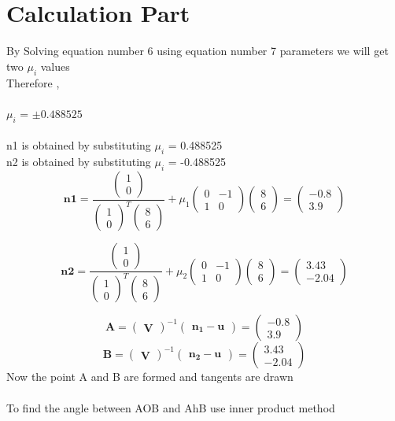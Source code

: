 \documentclass[journal,10pt,twocolumn]{article}
\newcommand{\myvec}[1]{\ensuremath{\begin{pmatrix}#1\end{pmatrix}}}
\begin{document}
\section*{Calculation Part}
By Solving equation number 6 using equation number 7 parameters we will get two $\mu_i$ values\\
Therefore ,\\\\
$\mu_i$ =  $\pm 0.488525$\\\\

n1 is obtained by substituting $\mu_i$ = 0.488525\\
n2 is obtained by substituting $\mu_i$ = -0.488525\\

\begin{equation}
	\boldsymbol{n1} = \frac{\myvec{1\\0}}{\myvec{1\\0}^T\myvec{8\\6}} + \mu_1\myvec{0&-1\\1&0}\myvec{8\\6} = \myvec{-0.8\\3.9}
\end{equation}

\begin{equation}
	\boldsymbol{n2} = \frac{\myvec{1\\0}}{\myvec{1\\0}^T\myvec{8\\6}} + \mu_2\myvec{0&-1\\1&0}\myvec{8\\6} = \myvec{3.43\\-2.04}
\end{equation}

\begin{equation}
	\boldsymbol{A} = \myvec{\boldsymbol V}^{-1}\myvec{\boldsymbol{n_1-u}} = \myvec{-0.8\\3.9}
\end{equation}
\begin{equation}
	\boldsymbol{B} = \myvec{\boldsymbol V}^{-1}\myvec{\boldsymbol{n_2-u}} = \myvec{3.43\\-2.04}
\end{equation}
Now the point A and B are formed and tangents are drawn \\\\
To find the angle between AOB and AhB use inner product method \\
\end{document}
